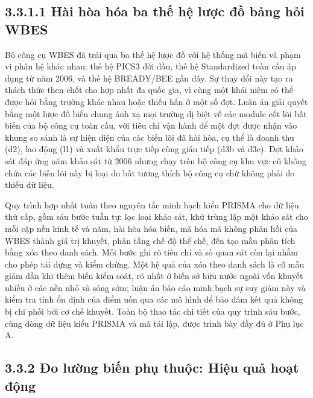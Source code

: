 \documentclass[
  a4paper,
  13pt]{extreport}
\begin{document}
\hypertarget{huxe0i-huxf2a-huxf3a-ba-thux1ebf-hux1ec7-lux1b0ux1ee3c-ux111ux1ed3-bux1ea3ng-hux1ecfi-wbes}{%
\subsection{3.3.1.1 Hài hòa hóa ba thế hệ lược đồ bảng hỏi
WBES}\label{huxe0i-huxf2a-huxf3a-ba-thux1ebf-hux1ec7-lux1b0ux1ee3c-ux111ux1ed3-bux1ea3ng-hux1ecfi-wbes}}

Bộ công cụ WBES đã trải qua ba thế hệ lược đồ với hệ thống mã biến và
phạm vi phân hệ khác nhau: thế hệ PICS3 đời đầu, thế hệ Standardized
toàn cầu áp dụng từ năm 2006, và thế hệ BREADY/BEE gần đây. Sự thay đổi
này tạo ra thách thức then chốt cho hợp nhất đa quốc gia, vì cùng một
khái niệm có thể được hỏi bằng trường khác nhau hoặc thiếu hẳn ở một số
đợt. Luận án giải quyết bằng một lược đồ biến chung ánh xạ mọi trường dị
biệt về các module cốt lõi bất biến của bộ công cụ toàn cầu, với tiêu
chí vận hành để một đợt được nhận vào khung so sánh là sự hiện diện của
các biến lõi đã hài hòa, cụ thể là doanh thu (d2), lao động (l1) và xuất
khẩu trực tiếp cùng gián tiếp (d3b và d3c). Đợt khảo sát đáp ứng năm
khảo sát từ 2006 nhưng chạy trên bộ công cụ khu vực cũ không chứa các
biến lõi này bị loại do bất tương thích bộ công cụ chứ không phải do
thiếu dữ liệu.

Quy trình hợp nhất tuân theo nguyên tắc minh bạch kiểu PRISMA cho dữ
liệu thứ cấp, gồm sáu bước tuần tự: lọc loại khảo sát, khử trùng lặp một
khảo sát cho mỗi cặp nền kinh tế và năm, hài hòa hóa biến, mã hóa mã
không phản hồi của WBES thành giá trị khuyết, phân tầng chế độ thể chế,
đến tạo mẫu phân tích bằng xóa theo danh sách. Mỗi bước ghi rõ tiêu chí
và số quan sát còn lại nhằm cho phép tái dựng và kiểm chứng. Một hệ quả
của xóa theo danh sách là cỡ mẫu giảm dần khi thêm biến kiểm soát, rõ
nhất ở biến sở hữu nước ngoài vốn khuyết nhiều ở các nền nhỏ và sóng
sớm; luận án báo cáo minh bạch sự suy giảm này và kiểm tra tính ổn định
của điểm uốn qua các mô hình để bảo đảm kết quả không bị chi phối bởi cơ
chế khuyết. Toàn bộ thao tác chi tiết của quy trình sáu bước, cùng dòng
dữ liệu kiểu PRISMA và mã tái lập, được trình bày đầy đủ ở Phụ lục A.

\hypertarget{ux111o-lux1b0ux1eddng-biux1ebfn-phux1ee5-thuux1ed9c-hiux1ec7u-quux1ea3-houx1ea1t-ux111ux1ed9ng}{%
\subsection{3.3.2 Đo lường biến phụ thuộc: Hiệu quả hoạt
động}\label{ux111o-lux1b0ux1eddng-biux1ebfn-phux1ee5-thuux1ed9c-hiux1ec7u-quux1ea3-houx1ea1t-ux111ux1ed9ng}}
\end{document}
